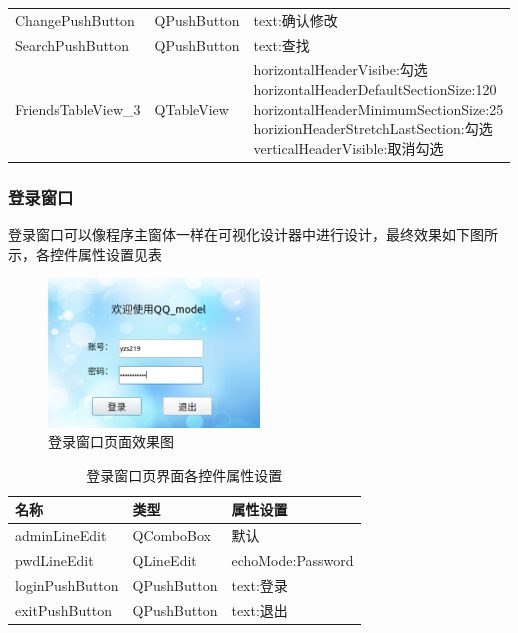 \documentclass{progartcn}
\begin{document}
\begin{table}[H]
\begin{tabular}{lll}
ChangePushButton           & QPushButton & text:确认修改                                                                                                                                                             \\
SearchPushButton           & QPushButton & text:查找                                                                                                                                                               \\
FriendsTableView\_3        & QTableView  & \makecell[l]{horizontalHeaderVisibe:勾选\\ horizontalHeaderDefaultSectionSize:120\\ horizontalHeaderMinimumSectionSize:25\\ horizionHeaderStretchLastSection:勾选\\ verticalHeaderVisible:取消勾选}
		\\
		\bottomrule[1.5pt]
	\end{tabular}
\end{table}

\subsubsection{登录窗口}

登录窗口可以像程序主窗体一样在可视化设计器中进行设计，最终效果如下图所示，各控件属性设置见表

\begin{figure}[H]
	\centering
	\includegraphics[width=0.5\textwidth]{9.png}
	\caption{\centering  登录窗口页面效果图}
\end{figure}

\begin{table}[H]
	\renewcommand{\arraystretch}{1.0}
	\centering
	\caption{\centering 登录窗口页界面各控件属性设置}
	\begin{tabular}{lll}
		\toprule[1.5pt]
		名称                   & 类型          & 属性设置                                                                                                                                                                  \\
		\midrule[1pt]
adminLineEdit   & QComboBox   & 默认                \\
pwdLineEdit     & QLineEdit   & echoMode:Password \\
loginPushButton & QPushButton & text:登录           \\
exitPushButton  & QPushButton & text:退出          \\
		\bottomrule[1.5pt]
	\end{tabular}
\end{table}
\end{document}

